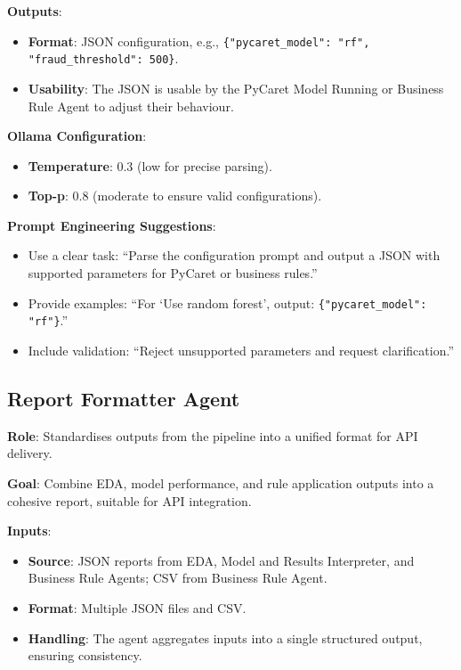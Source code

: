 \documentclass{article}
\begin{document}
\textbf{Outputs}:
\begin{itemize}[label=--]
    \item \textbf{Format}: JSON configuration, e.g., \texttt{\{"pycaret\_model": "rf", "fraud\_threshold": 500\}}.
    \item \textbf{Usability}: The JSON is usable by the PyCaret Model Running or Business Rule Agent to adjust their behaviour.
\end{itemize}

\textbf{Ollama Configuration}:
\begin{itemize}[label=--]
    \item \textbf{Temperature}: 0.3 (low for precise parsing).
    \item \textbf{Top-p}: 0.8 (moderate to ensure valid configurations).
\end{itemize}

\textbf{Prompt Engineering Suggestions}:
\begin{itemize}[label=--]
    \item Use a clear task: “Parse the configuration prompt and output a JSON with supported parameters for PyCaret or business rules.”
    \item Provide examples: “For ‘Use random forest’, output: \texttt{\{"pycaret\_model": "rf"\}}.”
    \item Include validation: “Reject unsupported parameters and request clarification.”
\end{itemize}

\subsection{Report Formatter Agent}

\textbf{Role}: Standardises outputs from the pipeline into a unified format for API delivery.

\textbf{Goal}: Combine EDA, model performance, and rule application outputs into a cohesive report, suitable for API integration.

\textbf{Inputs}:
\begin{itemize}[label=--]
    \item \textbf{Source}: JSON reports from EDA, Model and Results Interpreter, and Business Rule Agents; CSV from Business Rule Agent.
    \item \textbf{Format}: Multiple JSON files and CSV.
    \item \textbf{Handling}: The agent aggregates inputs into a single structured output, ensuring consistency.
\end{itemize}
\end{document}
